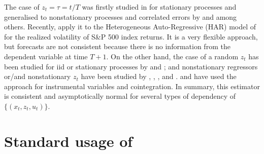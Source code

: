 The case of $z_t = \tau = t/T$ was firstly studied in \citet{Robinson1989} for stationary processes and generalised to nonstationary processes and correlated errors by \citet{ChangMartinezChombo2003} and \citet{Cai2007} among others. Recently, \citet{Chenetal2017} apply it to the Heterogeneous Auto-Regressive (HAR) model of \citet{Corsi2009} for the realized volatility of S\&P 500 index returns. It is a very flexible approach, but forecasts are not consistent because there is no information from the dependent variable at time $T+1$. On the other hand, the case of a random $z_t$ has been studied for iid or stationary processes by \citet{HastieTibshirani1993} and \citet{Caietal2000}; and nonstationary regressors or/and nonstationary $z_t$  have been studied by \citet{ChangMartinezChombo2003}, \citet{Caietal2009}, \citet{ZhangWue2012}, \citet{Sunetal2013}  and \citet{GaoPhillips2013}. \citet{Das2005} and \citet{xiao2013} have used the approach for instrumental variables and cointegration. In summary, this estimator is consistent and asymptotically normal for several types of dependency of $\{(x_t, z_t, u_t)\}$. 



\section{Standard usage of }
\label{ssec:tvLM}

